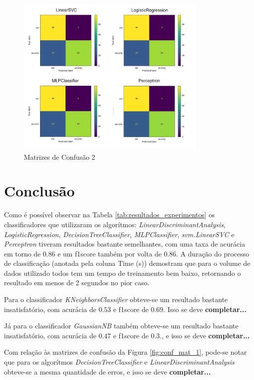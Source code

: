 \documentclass[conference]{IEEEtran}
\begin{document}
\begin{figure}[htbp]
    \centerline{\includegraphics[width=25em]{images/conf_mat_2.png}}
    \caption{Matrizes de Confusão 2}
    \label{fig:conf_mat_2}
\end{figure}

\section{Conclusão}

Como é possível observar na Tabela \ref{tab:resultados_experimentos} os classificadores que utilizaram os algorítmos: \textit{LinearDiscriminantAnalysis}, \textit{LogisticRegression}, \textit{DecisionTreeClassifier}, \textit{MLPClassifier}, \textit{svm.LinearSVC} e \textit{Perceptron} tiveram resultados bastante semelhantes, com uma taxa de acurácia em torno de $0.86$ e um f1score também por volta de $0.86$. A duração do processo de classificação (anotada pela coluna Time (s)) demostram que para o volume de dados utilizado todos tem um tempo de treinamento bem baixo, retornando o resultado em menos de 2 segundos no pior caso.

Para o classificador \textit{KNeighborsClassifier} obteve-se um resultado bastante insatisfatório, com acurácia de $0.53$ e f1score de $0.69$. Isso se deve \textbf{completar...}

Já para o classificador \textit{GaussianNB} também obteve-se um resultado bastante insatisfatório, com acurácia de $0.47$ e f1score de $0.3$., e isso se deve \textbf{completar...}

Com relação às matrizes de confusão da Figura \ref{fig:conf_mat_1}, pode-se notar que para os algorítmos \textit{DecisionTreeClassifier} e \textit{LinearDiscriminantAnalysis} obteve-se a mesma quantidade de erros, e isso se deve \textbf{completar...}
\end{document}
